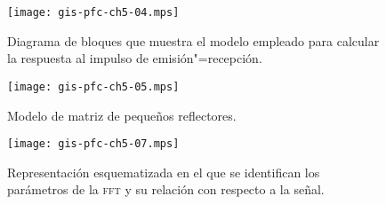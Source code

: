 \documentclass[a4paper,12pt]				{article}
\begin{document}
\begin{figure}
	\begin{center}
		\texttt{[image: gis-pfc-ch5-04.mps]}
	\end{center}
	\caption[Modelo de emisión"=transmisión]{Diagrama de bloques que
	muestra el modelo empleado para calcular la respuesta al impulso de
	emisión"=recepción.}
	\label{fig:model}
\end{figure}

\begin{figure}
	\begin{center}
		\texttt{[image: gis-pfc-ch5-05.mps]}
	\end{center}
	\caption[Modelo de matriz de pequeños reflectores]{Modelo de matriz
	de pequeños reflectores.}
	\label{fig:matrix}
\end{figure}

\begin{figure}
	\begin{center}
		\texttt{[image: gis-pfc-ch5-07.mps]}
	\end{center}
	\caption[Parámetros del banco de filtros]{Representación
	esquematizada en el que se identifican los parámetros de la
	\textsc{fft} y su relación con respecto a la señal.}
	\label{fig:filter}
\end{figure}
% 
% 
\end{document}
